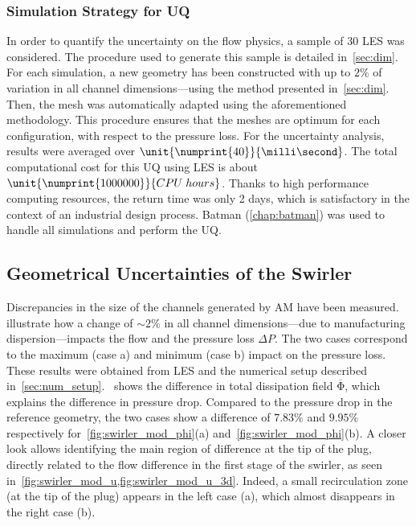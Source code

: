 \subsubsection{Simulation Strategy for UQ}

In order to quantify the uncertainty on the flow physics, a sample of 30 LES was considered. The procedure used to generate this sample is detailed in~\cref{sec:dim}. For each simulation, a new geometry has been constructed with up to $2\%$ of variation in all channel dimensions---using the method presented in~\cref{sec:dim}. Then, the mesh was automatically adapted using the aforementioned methodology. This procedure ensures that the meshes are optimum for each configuration, with respect to the pressure loss. For the uncertainty analysis, results were averaged over $\unit{\numprint{40}}{\milli\second}$. The total computational cost for this UQ using LES is about $\unit{\numprint{1000000}}{CPU\;hours}$. Thanks to high performance computing resources, the return time was only 2 days, which is satisfactory in the context of an industrial design process. Batman (\cref{chap:batman}) was used to handle all simulations and perform the UQ.

\subsection{Geometrical Uncertainties of the Swirler}

Discrepancies in the size of the channels generated by AM have been measured.  illustrate how a change of $\sim2$\% in all channel dimensions---due to manufacturing dispersion---impacts the flow and the pressure loss $\Delta P$. The two cases correspond to the maximum (case a) and minimum (case b) impact on the pressure loss. These results were obtained from LES and the numerical setup described in~\cref{sec:num_setup}.
~shows the difference in total dissipation field $\mathrm{\overline{\Phi}}$, which explains the difference in pressure drop.%
Compared to the pressure drop in the reference geometry, the two cases show a difference of $7.83\%$ and $9.95\%$ respectively for~\cref{fig:swirler_mod_phi}(a) and~\cref{fig:swirler_mod_phi}(b). 
A closer look allows identifying the main region of difference at the tip of the plug, directly related to the flow difference in the first stage of the swirler, as seen in~\cref{fig:swirler_mod_u,fig:swirler_mod_u_3d}. Indeed, a small recirculation zone (at the tip of the plug) appears in the left case (a), which almost disappears in the right case (b).

